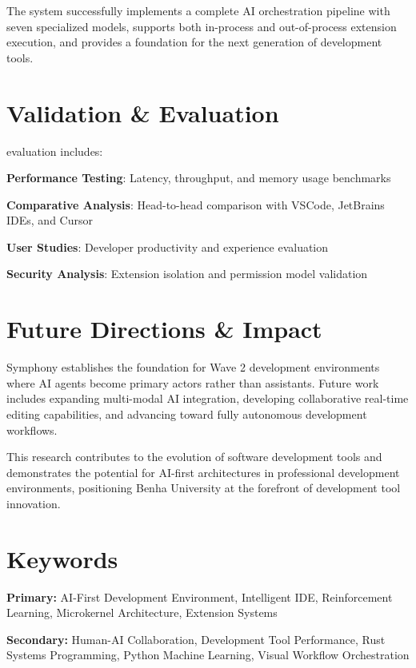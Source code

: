 The system successfully implements a complete AI orchestration pipeline with seven specialized models, supports both in-process and out-of-process extension execution, and provides a foundation for the next generation of development tools.

\section*{Validation \& Evaluation}

 evaluation includes:
\begin{compactlist}
    \item \textbf{Performance Testing}: Latency, throughput, and memory usage benchmarks
    \item \textbf{Comparative Analysis}: Head-to-head comparison with VSCode, JetBrains IDEs, and Cursor
    \item \textbf{User Studies}: Developer productivity and experience evaluation
    \item \textbf{Security Analysis}: Extension isolation and permission model validation
\end{compactlist}

\section*{Future Directions \& Impact}

\begin{alertbox}
Symphony establishes the foundation for Wave 2 development environments where AI agents become primary actors rather than assistants. Future work includes expanding multi-modal AI integration, developing collaborative real-time editing capabilities, and advancing toward fully autonomous development workflows.
\end{alertbox}

This research contributes to the evolution of software development tools and demonstrates the potential for AI-first architectures in professional development environments, positioning Benha University at the forefront of development tool innovation.

\section*{Keywords}

\textbf{Primary:} AI-First Development Environment, Intelligent IDE, Reinforcement Learning, Microkernel Architecture, Extension Systems

\textbf{Secondary:} Human-AI Collaboration, Development Tool Performance, Rust Systems Programming, Python Machine Learning, Visual Workflow Orchestration

\clearpage
